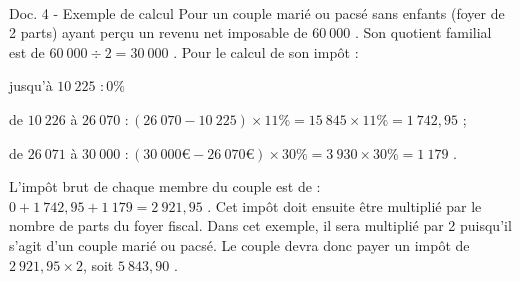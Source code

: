 \documentclass[11pt,a4paper]{article}  %
\begin{document}
\vspace*{-0.2cm}
\ \\
\begin{consequences}{Doc. 4 - Exemple de calcul}
	Pour un couple marié ou pacsé sans enfants (foyer de 2 parts) ayant perçu un revenu net imposable de $60\ 000$ \EUR{}. Son quotient familial est de $60\ 000 \div 2=30\ 000$ \EUR{}. Pour le calcul de son impôt :
	\begin{itemMet}
		\item jusqu'à $10\ 225$ \EUR{}$: 0 \%$
		\item de $10\ 226$ \EUR{} à $26\ 070$ \EUR{}$:(26\ 070-10\ 225) \times 11 \%=15\ 845 \times 11 \%=1\ 742,95$ \EUR{};
		\item de $26\ 071$ \EUR{} à $30\ 000$ \EUR{}$:(30\ 000 €-26\ 070 €) \times 30 \%=3\ 930\times 30 \%=1\ 179$ \EUR{}.
	\end{itemMet}
	L'impôt brut de chaque membre du couple est de : $0+1\ 742,95+1\ 179=2\ 921,95$ \EUR{}.
	Cet impôt doit ensuite être multiplié par le nombre de parts du foyer fiscal. Dans cet exemple, il sera multiplié par 2 puisqu'il s'agit d'un couple marié ou pacsé. Le couple devra donc payer un impôt de $2\ 921,95 \times 2$, soit $5\ 843,90$ \EUR{}.
\end{consequences}
\end{document}
